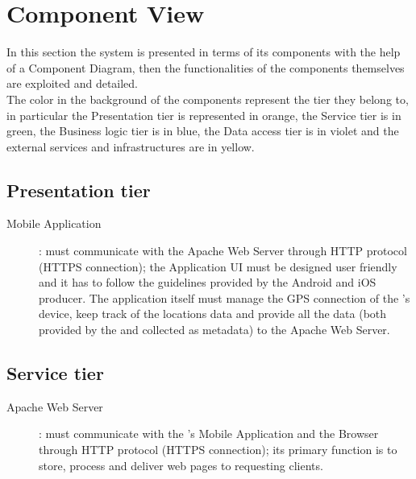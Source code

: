 \documentclass[../../DD.tex]{subfiles}
\begin{document}
\section{Component View\label{sect:2.2}}
 In this section the system is presented in terms of its components with the help of a Component Diagram, then the functionalities of the components themselves are exploited and detailed.\\

The color in the background of the components represent the tier they belong to, in particular the Presentation tier is represented in orange, the Service tier is in green, the Business logic tier is in blue, the Data access tier is in violet and the external services and infrastructures are in yellow.

	
\subsection{Presentation tier\label{sect:2.2.1}}
	\begin{description}
	\item[Mobile Application]: must communicate with the Apache Web Server through HTTP protocol (HTTPS connection); the Application UI must be designed user friendly and it has to follow the guidelines provided by the Android and iOS producer. The application itself must manage the GPS connection of the 's device, keep track of the locations data and provide all the data (both provided by the  and collected as metadata) to the Apache Web Server.
	\end{description}
	
\subsection{Service tier\label{sect:2.2.2}}
	\begin{description}
	\item[Apache Web Server]: must communicate with the 's Mobile Application and the  Browser through HTTP protocol (HTTPS connection); its primary function is to store, process and deliver web pages to requesting clients.
	\end{description}
	
\end{document}
